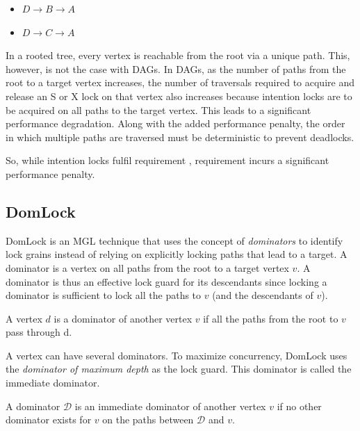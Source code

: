 \begin{itemize}
    \item $D \rightarrow B \rightarrow A$
    \item $D \rightarrow C \rightarrow A$
\end{itemize}




In a rooted tree, every vertex is reachable from the root via a unique path. 
This, however, is not the case with DAGs.
In DAGs, as the number of paths from the root to a target vertex increases, the number of traversals required to acquire and release an S or X lock on that vertex also increases because intention locks are to be acquired on all paths to the target vertex.
This leads to a significant performance degradation. Along with the added performance penalty, the order in which multiple paths are traversed must be deterministic to prevent deadlocks.  

So, while intention locks fulfil requirement \Rb, requirement \Rc incurs a significant performance penalty. 

\subsection{DomLock}
DomLock \cite{kalikar2016domlock} is an MGL technique that uses the concept of \emph{dominators} to identify lock grains instead of relying on explicitly locking paths that lead to a target. A dominator is a vertex on all paths from the root to a target vertex $v$. A dominator is thus an effective lock guard for its descendants since locking a dominator is sufficient to lock all the paths to $v$ (and the descendants of $v$).

\begin{definition}
    A vertex $d$ is a dominator of another vertex $v$ if all the paths from the root to $v$ pass through d.
\end{definition}

A vertex can have several dominators. 
To maximize concurrency, DomLock uses the \emph{dominator of maximum depth} as the lock guard. This dominator is called the immediate dominator. 


\begin{definition}
    A dominator $\mathcal{D}$ is an immediate dominator of another vertex $v$ if no other dominator exists for $v$ on the paths between $\mathcal{D}$ and $v$.
\end{definition}

